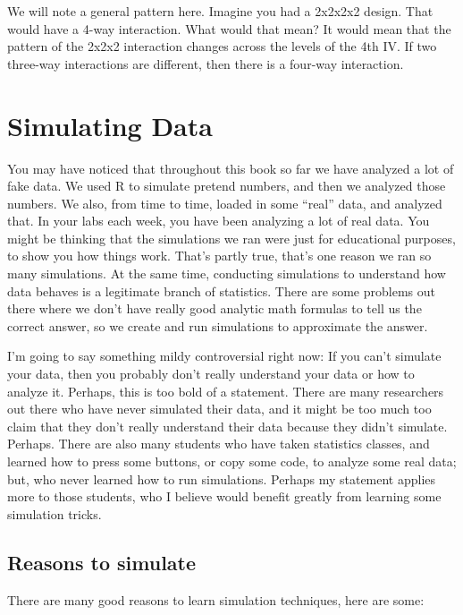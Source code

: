 \documentclass[
]{book}
\begin{document}
We will note a general pattern here. Imagine you had a 2x2x2x2 design. That would have a 4-way interaction. What would that mean? It would mean that the pattern of the 2x2x2 interaction changes across the levels of the 4th IV. If two three-way interactions are different, then there is a four-way interaction.

\chapter{Simulating Data}\label{simulating-data}

You may have noticed that throughout this book so far we have analyzed a lot of fake data. We used R to simulate pretend numbers, and then we analyzed those numbers. We also, from time to time, loaded in some ``real'' data, and analyzed that. In your labs each week, you have been analyzing a lot of real data. You might be thinking that the simulations we ran were just for educational purposes, to show you how things work. That's partly true, that's one reason we ran so many simulations. At the same time, conducting simulations to understand how data behaves is a legitimate branch of statistics. There are some problems out there where we don't have really good analytic math formulas to tell us the correct answer, so we create and run simulations to approximate the answer.

I'm going to say something mildy controversial right now: If you can't simulate your data, then you probably don't really understand your data or how to analyze it. Perhaps, this is too bold of a statement. There are many researchers out there who have never simulated their data, and it might be too much too claim that they don't really understand their data because they didn't simulate. Perhaps. There are also many students who have taken statistics classes, and learned how to press some buttons, or copy some code, to analyze some real data; but, who never learned how to run simulations. Perhaps my statement applies more to those students, who I believe would benefit greatly from learning some simulation tricks.

\section{Reasons to simulate}\label{reasons-to-simulate}

There are many good reasons to learn simulation techniques, here are some:
\end{document}
